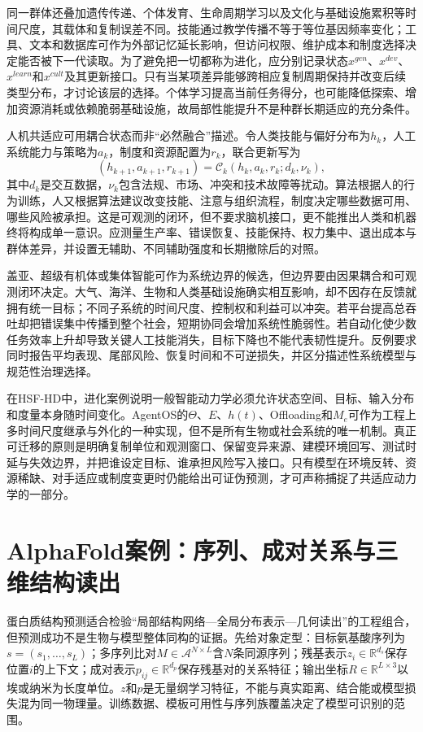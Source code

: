 同一群体还叠加遗传传递、个体发育、生命周期学习以及文化与基础设施累积等时间尺度，其载体和复制误差不同。技能通过教学传播不等于等位基因频率变化；工具、文本和数据库可作为外部记忆延长影响，但访问权限、维护成本和制度选择决定能否被下一代读取。为了避免把一切都称为进化，应分别记录状态$x^{gen}$、$x^{dev}$、$x^{learn}$和$x^{cult}$及其更新接口。只有当某项差异能够跨相应复制周期保持并改变后续类型分布，才讨论该层的选择。个体学习提高当前任务得分，也可能降低探索、增加资源消耗或依赖脆弱基础设施，故局部性能提升不是种群长期适应的充分条件。

人机共适应可用耦合状态而非“必然融合”描述。令人类技能与偏好分布为$h_k$，人工系统能力与策略为$a_k$，制度和资源配置为$r_k$，联合更新写为
\begin{equation}
 (h_{k+1},a_{k+1},r_{k+1})=\mathcal C_k(h_k,a_k,r_k;d_k,\nu_k),
\end{equation}
其中$d_k$是交互数据，$\nu_k$包含法规、市场、冲突和技术故障等扰动。算法根据人的行为训练，人又根据算法建议改变技能、注意与组织流程，制度决定哪些数据可用、哪些风险被承担。这是可观测的闭环，但不要求脑机接口，更不能推出人类和机器终将构成单一意识。应测量生产率、错误恢复、技能保持、权力集中、退出成本与群体差异，并设置无辅助、不同辅助强度和长期撤除后的对照。

盖亚、超级有机体或集体智能可作为系统边界的候选，但边界要由因果耦合和可观测闭环决定。大气、海洋、生物和人类基础设施确实相互影响，却不因存在反馈就拥有统一目标；不同子系统的时间尺度、控制权和利益可以冲突。若平台提高总吞吐却把错误集中传播到整个社会，短期协同会增加系统性脆弱性。若自动化使少数任务效率上升却导致关键人工技能消失，目标下降也不能代表韧性提升。反例要求同时报告平均表现、尾部风险、恢复时间和不可逆损失，并区分描述性系统模型与规范性治理选择。

在HSF-HD中，进化案例说明一般智能动力学必须允许状态空间、目标、输入分布和度量本身随时间变化。AgentOS的$\Theta$、$E$、$h(t)$、Offloading和$M_e$可作为工程上多时间尺度继承与外化的一种实现，但不是所有生物或社会系统的唯一机制。真正可迁移的原则是明确复制单位和观测窗口、保留变异来源、建模环境回写、测试时延与失效边界，并把谁设定目标、谁承担风险写入接口。只有模型在环境反转、资源稀缺、对手适应或制度变更时仍能给出可证伪预测，才可声称捕捉了共适应动力学的一部分。

\section{AlphaFold案例：序列、成对关系与三维结构读出}
\label{sec:alphafold_case_study}

蛋白质结构预测适合检验“局部结构网络—全局分布表示—几何读出”的工程组合，但预测成功不是生物与模型整体同构的证据。先给对象定型：目标氨基酸序列为$s=(s_1,\ldots,s_L)$；多序列比对$M\in\mathcal A^{N\times L}$含$N$条同源序列；残基表示$z_i\in\mathbb R^{d_s}$保存位置$i$的上下文；成对表示$p_{ij}\in\mathbb R^{d_p}$保存残基对的关系特征；输出坐标$R\in\mathbb R^{L\times 3}$以埃或纳米为长度单位。$z$和$p$是无量纲学习特征，不能与真实距离、结合能或模型损失混为同一物理量。训练数据、模板可用性与序列族覆盖决定了模型可识别的范围。

